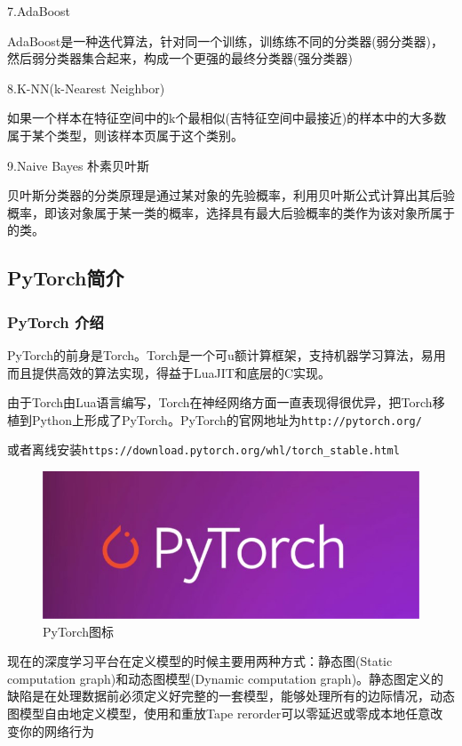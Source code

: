 \documentclass[openbib]{article}
\begin{document}
	\begin{center}
		7.AdaBoost
	\end{center}

	AdaBoost是一种迭代算法，针对同一个训练，训练练不同的分类器(弱分类器)，然后弱分类器集合起来，构成一个更强的最终分类器(强分类器)
	
	\begin{center}
		8.K-NN(k-Nearest Neighbor)
	\end{center}

	如果一个样本在特征空间中的k个最相似(吉特征空间中最接近)的样本中的大多数属于某个类型，则该样本页属于这个类别。
	
	\begin{center}
		9.Naive Bayes 朴素贝叶斯
	\end{center}

	贝叶斯分类器的分类原理是通过某对象的先验概率，利用贝叶斯公式计算出其后验概率，即该对象属于某一类的概率，选择具有最大后验概率的类作为该对象所属于的类。
	
	\subsection{PyTorch简介}
	\subsubsection{PyTorch 介绍}
	
	PyTorch的前身是Torch。Torch是一个可u额计算框架，支持机器学习算法，易用而且提供高效的算法实现，得益于LuaJIT和底层的C实现。
	
	由于Torch由Lua语言编写，Torch在神经网络方面一直表现得很优异，把Torch移植到Python上形成了PyTorch。PyTorch的官网地址为\texttt{http://pytorch.org/}
	
	或者离线安装\texttt{https://download.pytorch.org/whl/torch\_stable.html}
	
		\begin{figure}[htbp]
			\centering
			\includegraphics[scale=0.8]{PyTorch.jpg}
			\caption{PyTorch图标}
		\end{figure}
	现在的深度学习平台在定义模型的时候主要用两种方式：静态图(Static computation graph)和动态图模型(Dynamic computation graph)。静态图定义的缺陷是在处理数据前必须定义好完整的一套模型，能够处理所有的边际情况，动态图模型自由地定义模型，使用和重放Tape rerorder可以零延迟或零成本地任意改变你的网络行为
	
\end{document}
